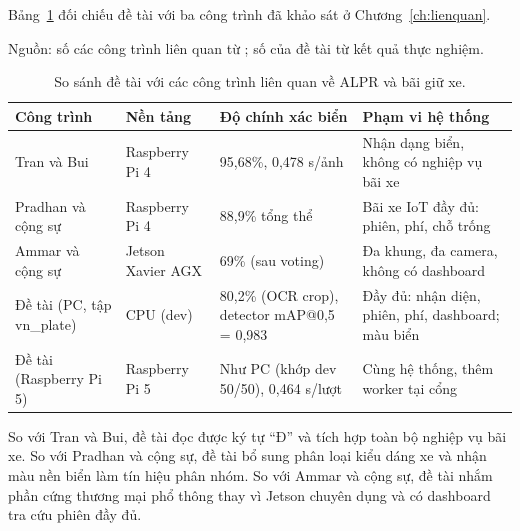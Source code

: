 Bảng~\ref{tab:compare-related} đối chiếu đề tài với ba công trình đã khảo sát ở
Chương~\ref{ch:lienquan}.

\begin{table}[htbp]
\centering
\caption{So sánh đề tài với các công trình liên quan về ALPR và bãi giữ xe.}
\label{tab:compare-related}

{\footnotesize Nguồn: số các công trình liên quan từ \autocite{tran2025vietnamlpr,pradhan2025iotparking,ammar2023multistage}; số của đề tài từ kết quả thực nghiệm.}
\begin{tabular}{p{3cm}p{2.5cm}p{2.5cm}p{3.5cm}}
\toprule
\textbf{Công trình} & \textbf{Nền tảng} & \textbf{Độ chính xác biển} & \textbf{Phạm vi hệ thống} \\
\midrule
Tran và Bui~\autocite{tran2025vietnamlpr}
  & Raspberry Pi 4
  & 95,68\%, 0,478 s/ảnh
  & Nhận dạng biển, không có nghiệp vụ bãi xe \\
Pradhan và cộng sự~\autocite{pradhan2025iotparking}
  & Raspberry Pi 4
  & 88,9\% tổng thể
  & Bãi xe IoT đầy đủ: phiên, phí, chỗ trống \\
Ammar và cộng sự~\autocite{ammar2023multistage}
  & Jetson Xavier AGX
  & 69\% (sau voting)
  & Đa khung, đa camera, không có dashboard \\
Đề tài (PC, tập vn\_plate)
  & CPU (dev)
  & 80,2\% (OCR crop), detector mAP@0,5 = 0,983
  & Đầy đủ: nhận diện, phiên, phí, dashboard; màu biển \\
Đề tài (Raspberry Pi 5)
  & Raspberry Pi 5
  & Như PC (khớp dev 50/50), 0,464 s/lượt
  & Cùng hệ thống, thêm worker tại cổng \\
\bottomrule
\end{tabular}
\end{table}

So với Tran và Bui, đề tài đọc được ký tự ``Đ'' và tích hợp toàn bộ nghiệp vụ bãi xe. So với Pradhan và cộng sự, đề tài bổ sung phân
loại kiểu dáng xe và nhận màu nền biển làm tín hiệu phân nhóm. So với Ammar và cộng sự, đề
tài nhắm phần cứng thương mại phổ thông thay vì Jetson chuyên dụng và có dashboard tra cứu
phiên đầy đủ.
